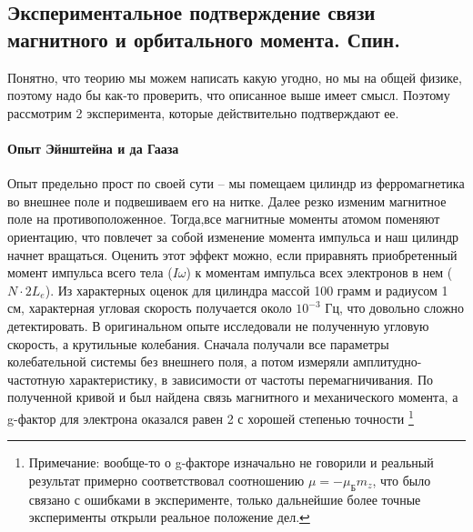 \documentclass[12pt]{article}
\begin{document}
\subsection{Экспериментальное подтверждение связи магнитного и орбитального момента. Спин.}
Понятно, что теорию мы можем написать какую угодно, но мы на общей физике, поэтому надо бы как-то проверить, что описанное выше имеет смысл. Поэтому рассмотрим 2 эксперимента, которые действительно подтверждают ее.
\paragraph{Опыт Эйнштейна и да Гааза}
Опыт предельно прост по своей сути -- мы помещаем цилиндр из ферромагнетика во внешнее поле и подвешиваем его на нитке. Далее резко изменим магнитное поле на противоположенное. Тогда,все магнитные моменты атомом поменяют ориентацию, что повлечет за собой изменение момента импульса и наш цилиндр начнет вращаться. Оценить этот эффект можно, если приравнять приобретенный момент импульса всего тела ($I\omega$) к моментам импульса всех электронов в нем ($N\cdot 2L_{e}$). Из характерных оценок для цилиндра массой 100 грамм и радиусом 1 см, характерная угловая скорость получается около $10^{-3}$ Гц, что довольно сложно детектировать. В оригинальном опыте исследовали не полученную угловую скорость, а крутильные колебания. Сначала получали все параметры колебательной системы без внешнего поля, а потом измеряли амплитудно-частотную характеристику, в зависимости от частоты перемагничивания. По полученной кривой и был найдена связь магнитного и механического момента, а g-фактор для электрона оказался равен 2 с хорошей степенью точности
\footnote{Примечание: вообще-то о g-факторе изначально не говорили и реальный результат примерно соответствовал соотношению $\mu = - \mu_{\text{Б}} m_z$, что было связано с ошибками в эксперименте, только дальнейшие более точные эксперименты открыли реальное положение дел.}
\end{document}
